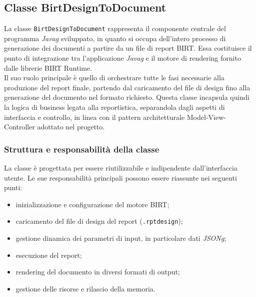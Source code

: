 \subsection{Classe BirtDesignToDocument}
La classe \texttt{BirtDesignToDocument} rappresenta il componente centrale del programma \emph{\gls{Javag}} sviluppato, in quanto si occupa dell'intero processo di generazione dei documenti a partire da un file di report BIRT. Essa costituisce il punto di integrazione tra l'applicazione \emph{\gls{Javag}} e il motore di rendering fornito dalle librerie BIRT Runtime.\\
Il suo ruolo principale è quello di orchestrare tutte le fasi necessarie alla produzione del report finale, partendo dal caricamento del file di design fino alla generazione del documento nel formato richiesto. Questa classe incapsula quindi la logica di business legata alla reportistica, separandola dagli aspetti di interfaccia e controllo, in linea con il pattern architetturale Model-View-Controller adottato nel progetto.

\subsubsection{Struttura e responsabilità della classe}
La classe è progettata per essere riutilizzabile e indipendente dall'interfaccia utente. Le sue responsabilità principali possono essere riassunte nei seguenti punti:
\begin{itemize}
    \item inizializzazione e configurazione del motore BIRT;
    \item caricamento del file di design del report (\texttt{.rptdesign});
    \item gestione dinamica dei parametri di input, in particolare dati \emph{\gls{JSONg}};
    \item esecuzione del report;
    \item rendering del documento in diversi formati di output;
    \item gestione delle risorse e rilascio della memoria.
\end{itemize}

